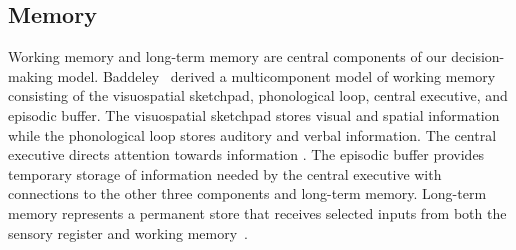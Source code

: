 


\subsection{Memory}
Working memory and long-term memory are central components of our decision-making model. 
Baddeley~\cite{baddeley1974working,alan1992working,baddeley2007working} derived a multicomponent model of working memory consisting of the visuospatial sketchpad, phonological loop, central executive, and episodic buffer.
The visuospatial sketchpad stores visual and spatial information while the phonological loop stores auditory and verbal information.
The central executive directs attention towards  information .
The episodic buffer provides temporary storage of information needed by the central executive with connections to the other three components and long-term memory.
Long-term memory represents a permanent store that receives selected inputs from both the sensory register and working memory~\cite{ATKINSON196889}.


